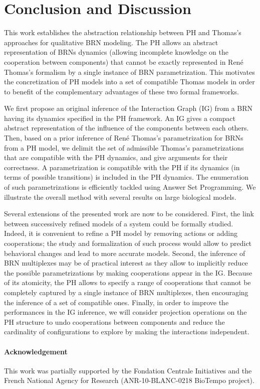 \section{Conclusion and Discussion}

This work establishes the abstraction relationship between PH and Thomas's approaches for
qualitative BRN modeling.
The PH allows an abstract representation of BRNs dynamics (allowing incomplete knowledge on the
cooperation between components) that cannot be exactly represented in Ren\'e Thomas's formalism by a
single instance of BRN parametrization.
This motivates the concretization of PH models into a set of compatible Thomas models in order to benefit
of the complementary advantages of these two formal frameworks.

We first propose an original inference of the Interaction Graph (IG) from a BRN
having its dynamics specified in the PH framework.
An IG gives a compact abstract representation of the influence of the components between each
others.
Then, based on a prior inference of Ren\'e Thomas's parametrization for BRNs from a PH model, we
delimit the set of admissible Thomas's parametrizations that are compatible with the PH dynamics,
and give arguments for their correctness.
A parametrization is compatible with the PH if its dynamics (in terms of possible transitions) is included in the PH dynamics.
The enumeration of such parametrizations is efficiently tackled using Answer Set Programming.
We illustrate the overall method with several results
on  large biological models.

Several extensions of the presented work are now to be considered.
First, the link between successively refined models of a system could be formally studied.
Indeed, it is convenient to refine a PH model by removing actions or adding cooperations;
the study and formalization of such process would allow to predict behavioral changes and lead to more accurate models.
Second, the inference of BRN multiplexes \cite{BernotMultiplexes} may be of practical interest 
as they allow to implicitly reduce the possible parametrizations by making cooperations appear
in the IG.
Because of its atomicity, the PH allows to specify a range of cooperations that cannot be
completely captured by a single instance of BRN multiplexes, then encouraging the inference of a set
of compatible ones.
Finally, in order to improve the performances in the IG inference, we will consider projection operations on
the PH structure to undo cooperations between components and reduce the cardinality of
configurations to explore by making the interactions independent.

\paragraph{Acknowledgement}
This work was partially supported by the Fondation Centrale Initiatives and
the French National Agency for Research (ANR-10-BLANC-0218 BioTempo project).

